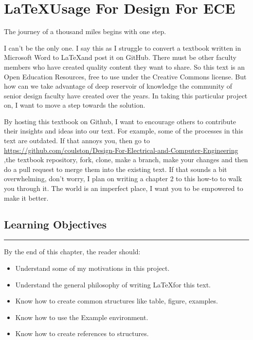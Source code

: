 \chapter{\LaTeX Usage For Design For ECE}
\label{chapter:latexUsage}
\graphicspath{ {./chapter01/Fig} }

\begin{itquote}
The journey of a thousand miles begins with one step.
\end{itquote}

I can't be the only one.  I say this as I struggle to convert a textbook written
in Microsoft Word to \LaTeX and post it on GitHub.  There must be other faculty
members who have created quality content they want to share.
So this text is an Open Education Resources, free to use under the Creative
Commons license.  But how can we take advantage of deep reservoir of 
knowledge the community of senior design faculty have created over the
years.   In taking this particular project on, I want to move a step
towards the solution.

By hosting this textbook on Github, I want to encourage others to contribute 
their insights and ideas into our text.  For example, some of the processes in
this text are outdated. If that annoys you, then go to \\
\url{https://github.com/coulston/Design-For-Electrical-and-Computer-Engineering}\\
,the textbook repository,
fork, clone, make a branch, make your changes and
then do a pull request to merge them into the existing text.  If that sounds a 
bit overwhelming, don't worry, I plan on writing a chapter 2 to this how-to
to walk you through it.  The world is an imperfect place, I want you to be 
empowered to make it better.

\section*{Learning Objectives}
\noindent\rule{\linewidth}{1pt}
By the end of this chapter, the reader should:
\begin{itemize}
\item Understand some of my motivations in this project.
\item Understand the general philosophy of writing \LaTeX for this text.
\item Know how to create common structures like table, figure, examples.
\item Know how to use the Example environment.
\item Know how to create references to structures.
\end{itemize}


